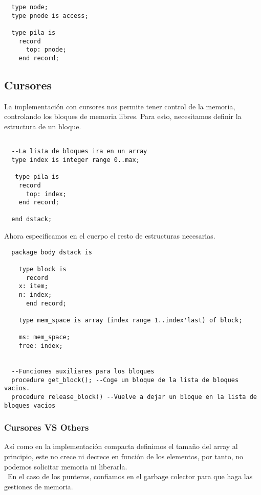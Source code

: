 \documentclass[a4paper,10pt]{book}
\begin{document}
\begin{lstlisting}
  type node;
  type pnode is access;
  
  type pila is
    record
      top: pnode;
    end record;
\end{lstlisting}

\subsection{Cursores}
La implementación con cursores nos permite tener control de la memoria, controlando los bloques de memoria libres. Para esto, necesitamos definir la estructura de un bloque.

\begin{lstlisting}
 
  --La lista de bloques ira en un array
  type index is integer range 0..max;
  
   type pila is
    record
      top: index;
    end record;
    
  end dstack;
  \end{lstlisting}
  
  Ahora especificamos en el cuerpo el resto de estructuras necesarias.
  
  \begin{lstlisting}
  package body dstack is
  
    type block is
      record
	x: item;
	n: index;
      end record;
      
    type mem_space is array (index range 1..index'last) of block;
    
    ms: mem_space;
    free: index;
 
    
  --Funciones auxiliares para los bloques
  procedure get_block(); --Coge un bloque de la lista de bloques vacios.
  procedure release_block() --Vuelve a dejar un bloque en la lista de bloques vacios
\end{lstlisting}

\subsubsection{Cursores VS Others}

Así como en la implementación compacta definimos el tamaño del array al principio, este no crece ni decrece en función de los elementos, por tanto, no podemos solicitar memoria ni liberarla.\\\
En el caso de los punteros, confiamos en el garbage colector para que haga las gestiones de memoria.
\end{document}
